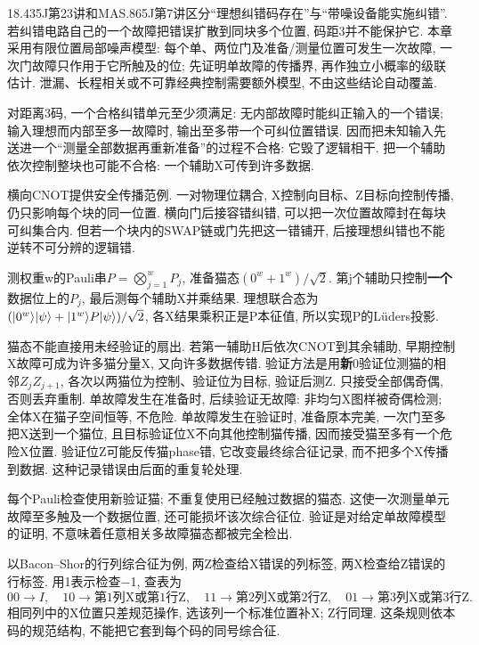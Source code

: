 18.435J第23讲和MAS.865J第7讲区分“理想纠错码存在”与“带噪设备能实施纠错”. 若纠错电路自己的一个故障把错误扩散到同块多个位置, 码距3并不能保护它. 本章采用有限位置局部噪声模型: 每个单、两位门及准备/测量位置可发生一次故障, 一次门故障只作用于它所触及的位; 先证明单故障的传播界, 再作独立小概率的级联估计. 泄漏、长程相关或不可靠经典控制需要额外模型, 不由这些结论自动覆盖.

对距离3码, 一个合格纠错单元至少须满足: 无内部故障时能纠正输入的一个错误; 输入理想而内部至多一故障时, 输出至多带一个可纠位置错误. 因而把未知输入先送进一个“测量全部数据再重新准备”的过程不合格: 它毁了逻辑相干. 把一个辅助依次控制整块也可能不合格: 一个辅助X可传到许多数据.

横向CNOT提供安全传播范例. 一对物理位耦合, X控制向目标、Z目标向控制传播, 仍只影响每个块的同一位置. 横向门后接容错纠错, 可以把一次位置故障封在每块可纠集合内. 但若一个块内的SWAP链或门先把这一错铺开, 后接理想纠错也不能逆转不可分辨的逻辑错.

测权重w的Pauli串$P=\bigotimes_{j=1}^wP_j$, 准备猫态$(0^w+1^w)/\sqrt2$. 第j个辅助只控制\textbf{一个}数据位上的$P_j$, 最后测每个辅助X并乘结果. 理想联合态为$(\lvert 0^w\rangle\lvert \psi\rangle+\lvert 1^w\rangle P\lvert \psi\rangle)/\sqrt2$, 各X结果乘积正是P本征值, 所以实现P的Lüders投影.

猫态不能直接用未经验证的扇出. 若第一辅助H后依次CNOT到其余辅助, 早期控制X故障可成为许多猫分量X, 又向许多数据传错. 验证方法是用\textbf{新}0验证位测猫的相邻$Z_jZ_{j+1}$, 各次以两猫位为控制、验证位为目标, 验证后测Z. 只接受全部偶奇偶, 否则丢弃重制. 单故障发生在准备时, 后续验证无故障: 非均匀X图样被奇偶检测; 全体X在猫子空间恒等, 不危险. 单故障发生在验证时, 准备原本完美, 一次门至多把X送到一个猫位, 且目标验证位X不向其他控制猫传播, 因而接受猫至多有一个危险X位置. 验证位Z可能反传猫phase错, 它改变最终综合征记录, 而不把多个X传播到数据. 这种记录错误由后面的重复轮处理.

每个Pauli检查使用新验证猫; 不重复使用已经触过数据的猫态. 这使一次测量单元故障至多触及一个数据位置, 还可能损坏该次综合征位. 验证是对给定单故障模型的证明, 不意味着任意相关多故障猫态都被完全检出.

以Bacon--Shor的行列综合征为例, 两Z检查给X错误的列标签, 两X检查给Z错误的行标签. 用1表示检查−1, 查表为
\[00\to I,\quad10\to\text{第1列X或第1行Z},\quad
11\to\text{第2列X或第2行Z},\quad01\to\text{第3列X或第3行Z}.\]
相同列中的X位置只差规范操作, 选该列一个标准位置补X; Z行同理. 这条规则依本码的规范结构, 不能把它套到每个码的同号综合征.

